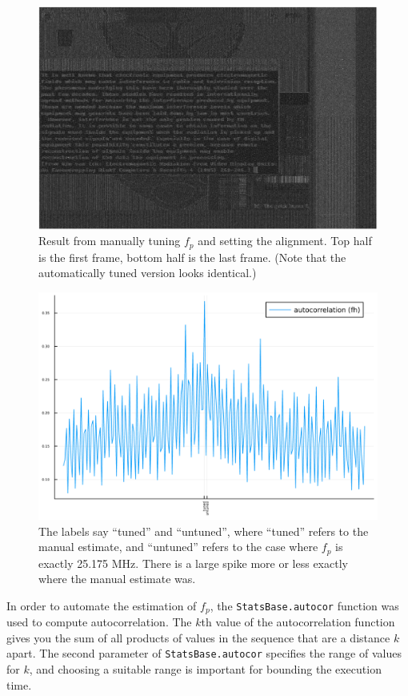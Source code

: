 \documentclass{article}
\newcommand*{\code}[1]{\texttt{#1}}
\begin{document}
\begin{figure}
    \centering
    \includegraphics[width=0.8\linewidth]{images/grayscale_manually_tuned_2_frames_joined.png}
    \caption{Result from manually tuning $f_p$ and setting the alignment. Top half is the first frame, bottom half is the last frame. (Note that the automatically tuned version looks identical.)}
    \label{fig:grayscale-image}
\end{figure}

\begin{figure}
    \centering
    \includegraphics[width=\linewidth]{images/autocor_fh.png}
    \caption{The labels say ``tuned'' and ``untuned'', where ``tuned'' refers to the manual estimate, and ``untuned'' refers to the case where $f_p$ is exactly 25.175 MHz. There is a large spike more or less exactly where the manual estimate was.}
    \label{fig:autocorrelation-fh}
\end{figure}

In order to automate the estimation of $f_p$, the \code{StatsBase.autocor} function was used to compute autocorrelation. The $k$th value of the autocorrelation function gives you the sum of all products of values in the sequence that are a distance $k$ apart. The second parameter of \code{StatsBase.autocor} specifies the range of values for $k$, and choosing a suitable range is important for bounding the execution time.
\end{document}
